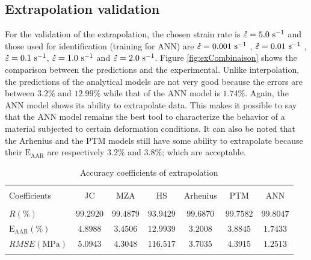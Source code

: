 \documentclass[twoside,english,1p,final,sort&compress]{elsarticle}
\theoremstyle{plain}
\newcommand{\mdot}[1]{\accentset{\mbox{\bfseries .}}{#1}}
\newcommand{\AARE}{\text{E}_\text{AAR}}
\newcommand{\ps}{\text{s}^{-1}}
\begin{document}
\subsection{Extrapolation validation}
For the validation of the extrapolation, the chosen strain rate is $\mdot\varepsilon = 5.0\ \ps$ and those used for identification (training for ANN) are $\mdot\varepsilon = 0.001\ \ps$ , $\mdot\varepsilon = 0.01\ \ps$ , $\mdot\varepsilon = 0.1\ \ps$, $\mdot\varepsilon = 1.0\ \ps$  and $\mdot\varepsilon = 2.0\ \ps$.
Figure \ref{fig:exCombinaison} shows the comparison between the predictions  and the experimental.
Unlike interpolation, the predictions of the analytical models are not very good because the errors are between $3.2\%$ and $12.99\%$ while that of the ANN model is $1.74\%$.
Again, the ANN model shows its ability to extrapolate data.
This makes it possible to say that the ANN model remains the best tool to characterize the behavior of a material subjected to certain deformation conditions.
It can also be noted that the Arhenius and the PTM models still have some ability to extrapolate because their $\AARE$ are respectively $ 3.2 \% $ and $ 3.8 \%$; which are acceptable.
\begin{table}[h!]
\centering{}
\caption{Accuracy coefficients of extrapolation}
\begin{tabular}{lcccccc}
\hline
&		&		&         &             &		   &	\\
Coefficients&JC  & MZA  &HS  & Arhenius      & PTM  &ANN \\
&				&				&         &             &	&\\
\hline
$R(\%)$&$99.2920$&$99.4879$&$93.9429$&$99.6870$& $99.7582$&$99.8047$\\
$\AARE(\%)$&$4.8988$&$3.4506$&$12.9939$&$3.2008$&$3.8845$&$1.7433$\\
$RMSE(\text{MPa})$&$5.0943$&$4.3048$&$116.517$&$3.7035$&$4.3915$&$1.2513$ \\
\hline
\label{tab:exValid}
\end{tabular}
\end{table}
\end{document}
